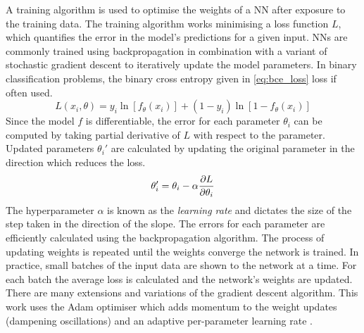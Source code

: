 A training algorithm is used to optimise the weights of a NN after exposure to the training data.
The training algorithm works minimising a loss function $L$, which quantifies the error in the model's predictions for a given input.
NNs are commonly trained using backpropagation in combination with a variant of stochastic gradient descent to iteratively update the model parameters.
In binary classification problems, the binary cross entropy given in \cref{eq:bce_loss} loss if often used.
%
\begin{equation}\label{eq:bce_loss}
  L(x_i, \theta) = y_i \ln[f_\theta(x_i)] + (1 - y_i) \ln[1 - f_\theta(x_i)]
\end{equation}
%
Since the model $f$ is differentiable, the error for each parameter $\theta_i$ can be computed by taking partial derivative of $L$ with respect to the parameter.
Updated parameters $\theta_i'$ are calculated by updating the original parameter in the direction which reduces the loss.
%
\begin{equation}\label{eq:weight_update}
  \theta_i' = \theta_i - \alpha \frac{\partial {L}}{\partial \theta_i}
\end{equation}
%
The hyperparameter $\alpha$ is known as the \textit{learning rate} and dictates the size of the step taken in the direction of the slope. 
The errors for each parameter are efficiently calculated using the backpropagation algorithm.
The process of updating weights is repeated until the weights converge the network is trained.
In practice, small batches of the input data are shown to the network at a time. For each batch the average loss is calculated and the network's weights are updated.
There are many extensions and variations of the gradient descent algorithm.
This work uses the Adam optimiser which adds momentum to the weight updates (dampening oscillations) and an adaptive per-parameter learning rate \cite{2014arXiv1412.6980K}.

